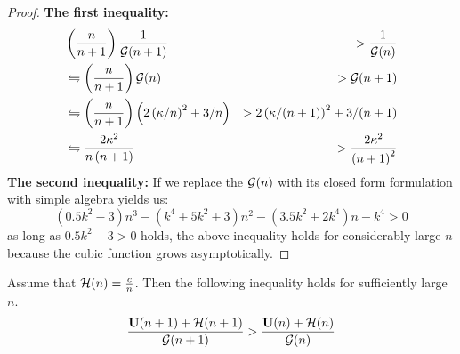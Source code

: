 \documentclass{article}
\begin{document}
\begin{proof}
	\textbf{The first inequality:}
	\begin{eqnarray*}	
		& \left( \frac{n}{n+1}\right) \frac{1}{{\cal G}(n+1)}  & > 
	\frac{1}{{\cal G}(n)} \\ 
	  &\leftrightharpoons  \left( \frac{n}{n+1}\right)  {\cal G}(n) & > {\cal G}(n+1) \\
	   & \leftrightharpoons  \left( \frac{n}{n+1}\right) \left(2\left(
	   \kappa/n\right)^2 + 3/n \right) & > 2\left( \kappa/(n+1)\right)^2 + 3/(n+1) \\ 
	   & \leftrightharpoons  \frac{2 \kappa^2}{n\left(n+1\right)} & >  \frac{2
	   \kappa^2}{\left(n+1\right)^2}
	\end{eqnarray*}
	\textbf{The second inequality:}
	If we replace the ${\cal G}(n)$ with its closed form formulation with simple
	algebra yields us:
	\begin{equation*}
		(0.5 k^2-3) n^3 -(k^4 + 5 k^2 +3 ) n^2 -(3.5 k^2 +2 k^4) n -k^4 >0 
	\end{equation*}
	as long as $0.5 k^2 - 3 >0$ holds, the above inequality holds for considerably
	large $n$ because the cubic function grows asymptotically.
\end{proof}
\begin{lemma}
	Assume that ${\cal H}(n) = \frac{c}{n}$. Then the
	following inequality holds for sufficiently large $n$.
	  \begin{equation*}
		\frac{\mathbf U(n+1)+{\cal H}(n+1)}{{\cal G}(n+1)} >
		\frac{\mathbf U(n)+{\cal H}(n)}{{\cal G}(n)}
	\end{equation*}
\end{lemma}
\end{document}
